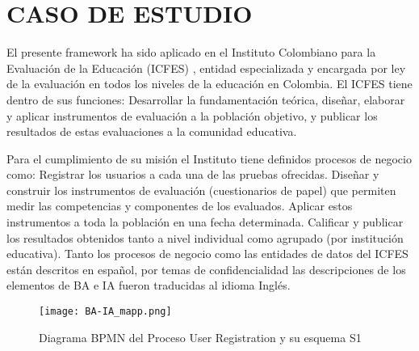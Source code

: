 \chapter{CASO DE ESTUDIO}  \label{cha:studycase}

El presente framework ha sido aplicado en el Instituto Colombiano para la Evaluaci\'on de la Educaci\'on (ICFES) \cite{icfes:2012}, entidad especializada y encargada por ley de la evaluaci\'on en todos los niveles de la educaci\'on en Colombia. El ICFES tiene dentro de sus funciones: Desarrollar la fundamentaci\'on te\'orica, dise\~nar, elaborar y aplicar instrumentos de evaluaci\'on a la poblaci\'on objetivo, y publicar los resultados de estas evaluaciones a la comunidad educativa.

Para el cumplimiento de su misi\'on el Instituto tiene definidos procesos de negocio como: Registrar los usuarios a cada una de las pruebas ofrecidas. Dise\~nar y construir los instrumentos de evaluaci\'on (cuestionarios de papel) que permiten medir las competencias y componentes de los evaluados. Aplicar estos instrumentos a toda la poblaci\'on en una fecha determinada. Calificar y publicar los resultados obtenidos tanto a nivel individual como agrupado (por instituci\'on educativa). Tanto los procesos de negocio como las entidades de datos del ICFES est\'an descritos en espa\~nol, por temas de confidencialidad las descripciones de los elementos de BA e IA fueron traducidas al idioma Ingl\'es.

\begin{figure}[!t]
\begin{center}
	\texttt{[image: BA-IA\_mapp.png]}
	\caption{Diagrama BPMN del Proceso User Registration y su esquema S1}
	\label{fig:BA-IA}
\end{center}
\end{figure} 


